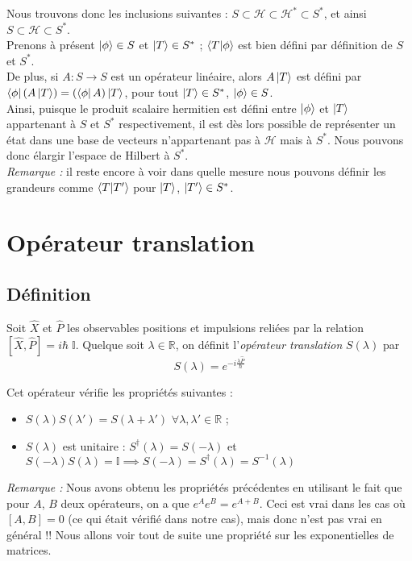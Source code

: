 \documentclass[../notesdecours]{subfiles}
\begin{document}
Nous trouvons donc les inclusions suivantes : $S \subset \mathcal{H} \subset \mathcal{H}^* \subset S^*$, et ainsi $S \subset \mathcal{H} \subset S^*$. \\

Prenons à présent $\ket{\phi} \in S$ et $\ket{T} \in S^*$ ; $\braket{T|\phi}$ est bien défini par définition de $S$ et $S^*$. \\
De plus, si $A : S \rightarrow S$ est un opérateur linéaire, alors $A \ket{T}$ est défini par $\bra{\phi}(A\ket{T}) = (\bra{\phi}A)\ket{T}$, pour tout $\ket{T} \in S^*$, $\ket{\phi} \in S$. \\
Ainsi, puisque le produit scalaire hermitien est défini entre $\ket{\phi}$ et $\ket{T}$ appartenant à $S$ et $S^*$ respectivement, il est dès lors possible de représenter un état dans une base de vecteurs n'appartenant pas à $\mathcal{H}$ mais à $S^*$. Nous pouvons donc élargir l'espace de Hilbert à $S^*$. \\

\textit{Remarque :} il reste encore à voir dans quelle mesure nous pouvons définir les grandeurs comme $\braket{T|T'}$ pour $\ket{T}$, $\ket{T'} \in S^*$. 


\section{Opérateur translation}
\subsection{Définition}
Soit $\hat{X}$ et $\hat{P}$ les observables positions et impulsions reliées par la relation $[\hat{X}, \hat{P}] = i\hbar \; \mathbb{I}$. Quelque soit $\lambda \in \mathbb{R}$, on définit l'\emph{opérateur translation} $S(\lambda)$ par
$$ S(\lambda) = e^{-i\frac{\lambda \hat{P}}{\hbar}} $$

Cet opérateur vérifie les propriétés suivantes : 
\begin{itemize}[label = \textbullet]
    \item $S(\lambda) S(\lambda') = S(\lambda + \lambda')$  \; $\forall \lambda, \lambda' \in \mathbb{R}$ ; 
    \item $S(\lambda)$ est unitaire : $S^\dagger (\lambda) = S(-\lambda)$ et $S(-\lambda)S(\lambda) = \mathbb{I} \implies S(-\lambda) = S^\dagger(\lambda) = S^{-1}(\lambda)$
\end{itemize}

\textit{Remarque :} Nous avons obtenu les propriétés précédentes en utilisant le fait que pour $A$, $B$ deux opérateurs, on a que $e^A e^B = e^{A+B}$. Ceci est vrai dans les cas où $[A, B] = 0$ (ce qui était vérifié dans notre cas), mais donc n'est pas vrai en général !! Nous allons voir tout de suite une propriété sur les exponentielles de matrices. \\
\end{document}
